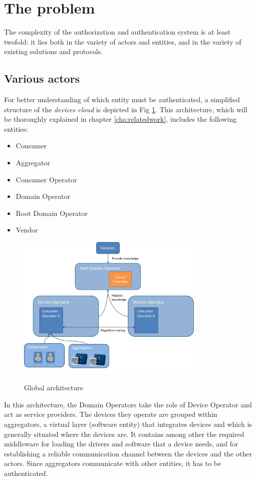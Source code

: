 \section{The problem}
The complexity of the authorization and authentication system is at least twofold: it lies both in the variety of actors and entities, and in the variety of existing solutions and protocols.

\subsection{Various actors} 
For better understanding of which entity must be authenticated, a simplified structure of the \emph{devices cloud} is depicted in Fig \ref*{fig:concept__architecture}. This architecture, which will be thoroughly explained in chapter \ref{cha:relatedwork}, includes the following entities:
\begin{itemize}
	\item Consumer
	\item Aggregator
	\item Consumer Operator
	\item Domain Operator
	\item Root Domain Operator
	\item Vendor
\end{itemize}

\begin{figure}[!ht]
	\centering
	\includegraphics[width=0.8\textwidth]{images/design.png}\\
	\caption{Global architecture}
	\label{fig:concept__architecture}
\end{figure}

In this architecture, the Domain Operators take the role of Device Operator and act as service providers. The devices they operate are grouped within aggregators, a virtual layer (software entity) that integrates devices and which is generally situated where the devices are. It contains among other the required middleware for loading the drivers and software that a device needs, and for establishing a reliable communication channel between the devices and the other actors. Since aggregators communicate with other entities, it has to be authenticated.

